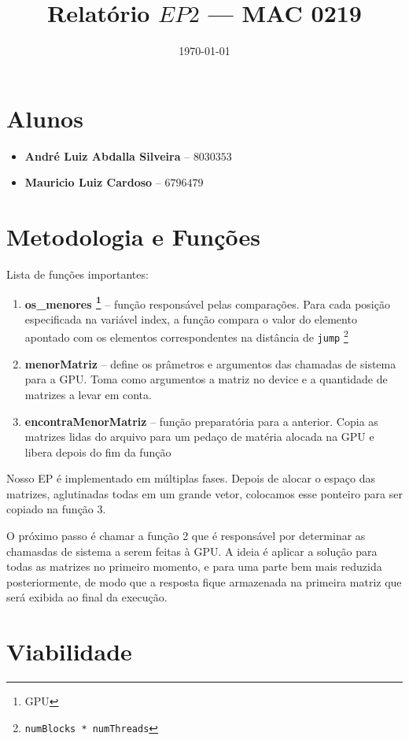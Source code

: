 \documentclass[11pt]{article}
\author{}
\date{\today}
\title{Relatório $EP2$ --- MAC 0219}
\begin{document}
\maketitle

\section{Alunos}
\begin{itemize}
	\item \textbf{André Luiz Abdalla Silveira} -- $8030353$
	\item \textbf{Mauricio Luiz Cardoso} -- $6796479$
\end{itemize}

\section{Metodologia e Funções}

Lista de funções importantes: \begin{enumerate}
	\item \textbf{os\_menores \footnote{GPU}} -- função responsável pelas comparações. Para cada posição especificada na variável index, a função compara o valor do elemento apontado com os elementos correspondentes na distância de \texttt{jump} \footnote{\texttt{numBlocks * numThreads}} 
	\item \textbf{menorMatriz} -- define os prâmetros e argumentos das chamadas de sistema para a GPU. Toma como argumentos a matriz no device e a quantidade de matrizes a levar em conta.
	\item \textbf{encontraMenorMatriz} -- função preparatória para a anterior. Copia as matrizes lidas do arquivo para um pedaço de matéria alocada na GPU e libera depois do fim da função
\end{enumerate}

Nosso EP é implementado em múltiplas fases. Depois de alocar o espaço das matrizes, aglutinadas todas em um grande vetor, colocamos esse ponteiro para ser copiado na função 3.

O próximo passo é chamar a função 2 que é responsável por determinar as chamasdas de sistema a serem feitas à GPU. A ideia é aplicar a solução para todas as matrizes no primeiro momento, e para uma parte bem mais reduzida posteriormente, de modo que a resposta fique armazenada na primeira matriz que será exibida ao final da execução.

\section{Viabilidade}
\end{document}
